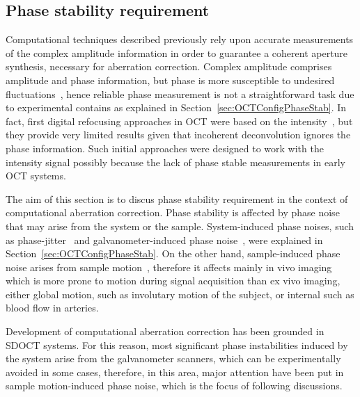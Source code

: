 \subsection{Phase stability requirement} \label{sec:phaseStab}

Computational techniques described previously rely upon accurate measurements of the complex amplitude information in order to guarantee a coherent aperture synthesis, necessary for aberration correction. Complex amplitude comprises amplitude and phase information, but phase is more susceptible to undesired fluctuations~\cite{Vakoc2005_Phaseresolved}, hence reliable phase measurement is not a straightforward task due to experimental contains as explained in Section~\ref{sec:OCTConfigPhaseStab}. In fact, first digital refocusing approaches in OCT were based on the intensity~\cite{Ralston2005_Deconvolution, Woolliams2010_Spatially, Y.Liu2009_Deconvolution}, but they provide very limited results given that incoherent deconvolution ignores the phase information. Such initial approaches were designed to work with the intensity signal possibly because the lack of phase stable measurements in early OCT systems.

The aim of this section is to discus phase stability requirement in the context of computational aberration correction. Phase stability is affected by phase noise that may arise from the system or the sample. System-induced phase noises, such as phase-jitter~\cite{Vakoc2005_Phaseresolved} and galvanometer-induced phase noise~\cite{Adie2015_Interferometric, White2003_vivo}, were explained in Section~\ref{sec:OCTConfigPhaseStab}. On the other hand, sample-induced phase noise arises from sample motion~\cite{Shemonski2014_Stability-1}, therefore it affects mainly in vivo imaging which is more prone to motion during signal acquisition than ex vivo imaging, either global motion, such as involutary motion of the subject, or internal such as blood flow in arteries.

Development of computational aberration correction has been grounded in SDOCT systems. For this reason, most significant phase instabilities induced by the system arise from the galvanometer scanners, which can be experimentally avoided in some cases, therefore, in this area, major attention have been put in sample motion-induced phase noise, which is the focus of following discussions.

